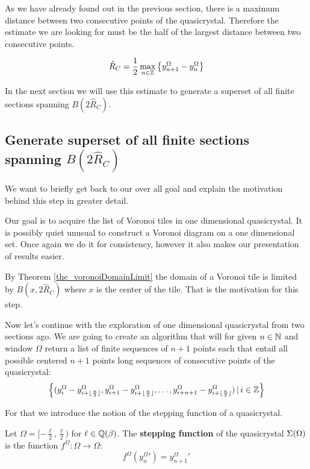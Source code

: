 \documentclass[text.tex]{subfiles}
\begin{document}
As we have already found out in the previous section, there is a maximum distance between two consecutive points of the quasicrystal. Therefore the estimate we are looking for must be the half of the largest distance between two consecutive points. 

$$\hat{R}_C = \frac{1}{2}\max_{n\in\mathbb{Z}}\big\{y^\Omega_{n+1}-y^\Omega_n\big\}$$

In the next section we will use this estimate to generate a superset of all finite sections spanning $B(2\hat{R}_C)$. 

\subsection{Generate superset of all finite sections spanning $B(2\hat{R}_C)$}
We want to briefly get back to our over all goal and explain the motivation behind this step in greater detail. 

Our goal is to acquire the list of Voronoi tiles in one dimensional quasicrystal. It is possibly quiet unusual to construct a Voronoi diagram on a one dimensional set. Once again we do it for consistency, however it also makes our presentation of results easier. 

By Theorem \ref{the_voronoiDomainLimit} the domain of a Voronoi tile is limited by $B(x, 2\hat{R}_C)$ where $x$ is the center of the tile. That is the motivation for this step. 

Now let's continue with the exploration of one dimensional quasicrystal from two sections ago. We are going to create an algorithm that will for given $n\in\mathbb{N}$ and window $\Omega$ return a list of finite sequences of $n+1$ points each that entail all possible centered $n+1$ points long sequences of consecutive points of the quasicrystal: 
$$\left\{ (y^\Omega_{i}-y^\Omega_{i+\lfloor\frac{n}{2}\rfloor}, y^\Omega_{i+1}-y^\Omega_{i+\lfloor\frac{n}{2}\rfloor}, \dots, y^\Omega_{i+n+1}-y^\Omega_{i+\lfloor\frac{n}{2}\rfloor} )\,|\, i\in\mathbb{Z} \right\}$$

For that we introduce the notion of the stepping function of a quasicrystal. 

\begin{definition}
\label{def_steppingFunction}
Let $\Omega = [-\frac{\ell}{2},\frac{\ell}{2})$ for $\ell\in\mathbb{Q}(\beta)$. The \textbf{stepping function} of the quasicrystal $\Sigma(\Omega)$ is the function $f^\Omega: \Omega \to \Omega$: 
$$f^\Omega ({y^\Omega_{n}}') = {y^\Omega_{n+1}}'$$ 
\end{definition}
\end{document}
